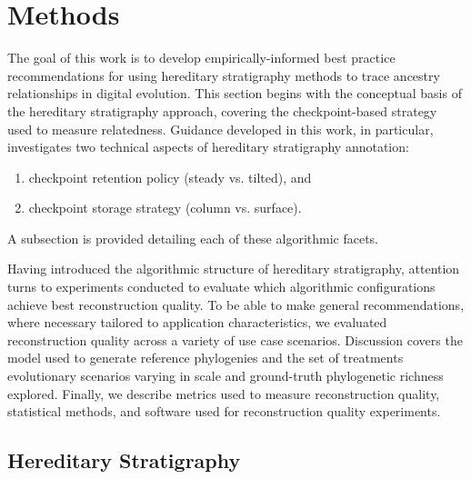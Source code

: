 \section{Methods} \label{sec:methods}

The goal of this work is to develop empirically-informed best practice recommendations for using hereditary stratigraphy methods to trace ancestry relationships in digital evolution.
This section begins with the conceptual basis of the hereditary stratigraphy approach, covering the checkpoint-based strategy used to measure relatedness.
Guidance developed in this work, in particular, investigates two technical aspects of hereditary stratigraphy annotation:
\begin{enumerate}
\item checkpoint retention policy (steady vs. tilted), and
\item checkpoint storage strategy (column vs. surface).
\end{enumerate}
A subsection is provided detailing each of these algorithmic facets.

Having introduced the algorithmic structure of hereditary stratigraphy, attention turns to experiments conducted to evaluate which algorithmic configurations achieve best reconstruction quality.
To be able to make general recommendations, where necessary tailored to application characteristics, we evaluated reconstruction quality across a variety of use case scenarios.
Discussion covers the model used to generate reference phylogenies and the set of treatments evolutionary scenarios varying in scale and ground-truth phylogenetic richness explored.
Finally, we describe metrics used to measure reconstruction quality, statistical methods, and software used for reconstruction quality experiments.

\subsection{Hereditary Stratigraphy}

